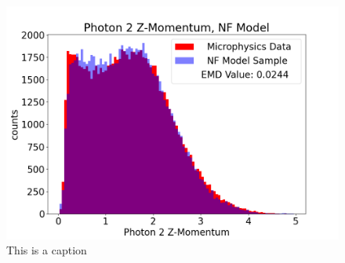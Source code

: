 \begin{figure}[!ht]
\begin{minipage}{0.23\textwidth}
        \includegraphics[width=.99\textwidth,trim={3cm 0 0 0},clip]{FinalPictures/Features16/Photon_2_Z-Momentum,_NF_Model.png}
    \end{minipage}
    \caption{This is a caption}
    \label{fig:a}
\end{figure}




